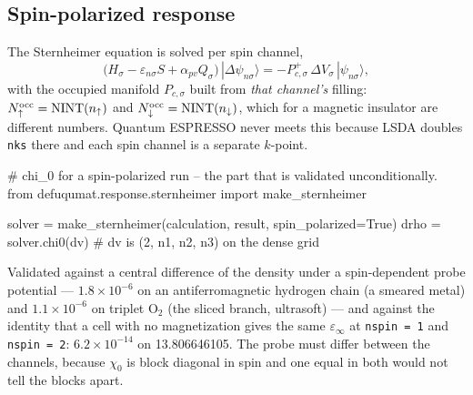 \documentclass[11pt,a4paper]{article}
\newcommand{\code}[1]{\texttt{\small #1}}
\begin{document}
\subsection{Spin-polarized response}

The Sternheimer equation is solved per spin channel,
\begin{equation*}
  \bigl(H_\sigma - \varepsilon_{n\sigma} S + \alpha_{pv} Q_\sigma\bigr)
  \,|\Delta\psi_{n\sigma}\rangle
  = -P^{+}_{c,\sigma}\,\Delta V_\sigma\,|\psi_{n\sigma}\rangle ,
\end{equation*}
with the occupied manifold $P_{c,\sigma}$ built from \emph{that channel's}
filling: $N^{\rm occ}_\uparrow = \mathrm{NINT}(n_\uparrow)$ and
$N^{\rm occ}_\downarrow = \mathrm{NINT}(n_\downarrow)$, which for a magnetic
insulator are different numbers. Quantum ESPRESSO never meets this because LSDA
doubles \code{nks} there and each spin channel is a separate $k$-point.

\begin{pycode}
# chi_0 for a spin-polarized run -- the part that is validated unconditionally.
from defuqumat.response.sternheimer import make_sternheimer

solver = make_sternheimer(calculation, result, spin_polarized=True)
drho = solver.chi0(dv)          # dv is (2, n1, n2, n3) on the dense grid
\end{pycode}

Validated against a central difference of the density under a spin-dependent
probe potential --- $1.8\times10^{-6}$ on an antiferromagnetic hydrogen chain (a
smeared metal) and $1.1\times10^{-6}$ on triplet O$_2$ (the sliced branch,
ultrasoft) --- and against the identity that a cell with no magnetization gives
the same $\varepsilon_\infty$ at \code{nspin = 1} and \code{nspin = 2}:
$6.2\times10^{-14}$ on 13.806646105. The probe must differ between the channels,
because $\chi_0$ is block diagonal in spin and one equal in both would not tell
the blocks apart.
\end{document}
